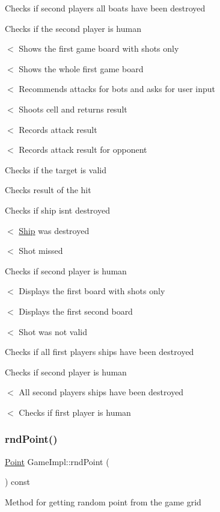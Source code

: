 Checks if second player\textquotesingle{}s all boats have been destroyed

Checks if the second player is human

$<$ Shows the first game board with shots only

$<$ Shows the whole first game board

$<$ Recommends attacks for bots and asks for user input

$<$ Shoots cell and returns result

$<$ Records attack result

$<$ Records attack result for opponent

Checks if the target is valid

Checks result of the hit

Checks if ship isn\textquotesingle{}t destroyed

$<$ \mbox{\hyperlink{class_ship}{Ship}} was destroyed

$<$ Shot missed

Checks if second player is human

$<$ Displays the first board with shots only

$<$ Displays the first second board

$<$ Shot was not valid

Checks if all first player\textquotesingle{}s ships have been destroyed

Checks if second player is human

$<$ All second player\textquotesingle{}s ships have been destroyed

$<$ Checks if first player is human \mbox{\label{class_game_impl_a647d740893579abd77cc1d58ac600da7}} 
\subsubsection{\texorpdfstring{rnd\+Point()}{rndPoint()}}
{\footnotesize\ttfamily \mbox{\hyperlink{class_point}{Point}} Game\+Impl\+::rnd\+Point (\begin{DoxyParamCaption}{ }\end{DoxyParamCaption}) const}

Method for getting random point from the game grid \mbox{\label{class_game_impl_a705c32b11b7cfaf9e8fd442c6434f7df}} 
